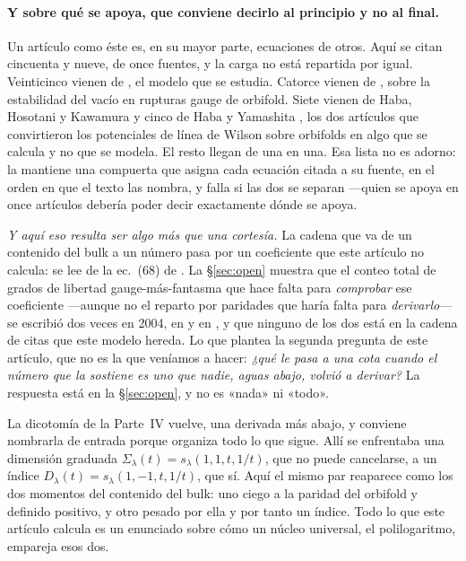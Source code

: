 \documentclass[11pt,a4paper]{article}
\begin{document}
\paragraph{Y sobre qué se apoya, que conviene decirlo al principio y no al final.} Un artículo como
éste es, en su mayor parte, ecuaciones de otros. Aquí se citan cincuenta y nueve, de once fuentes,
y la carga no está repartida por igual. Veinticinco vienen de \cite{KM25}, el modelo que se
estudia. Catorce vienen de \cite{CCD24}, sobre la estabilidad del vacío en rupturas gauge de
orbifold. Siete vienen de Haba, Hosotani y Kawamura \cite{HHK03} y cinco de Haba y Yamashita
\cite{HY04}, los dos artículos que convirtieron los potenciales de línea de Wilson sobre orbifolds
en algo que se calcula y no que se modela. El resto llegan de una en una. Esa lista no es adorno:
la mantiene una compuerta que asigna cada ecuación
citada a su fuente, en el orden en que el texto las nombra, y falla si las dos se separan ---quien
se apoya en once artículos debería poder decir exactamente dónde se apoya.

\emph{Y aquí eso resulta ser algo más que una cortesía.} La cadena que va de un contenido del bulk
a un número pasa por un coeficiente que este artículo no calcula: se lee de la ec.~(68) de
\cite{KM25}. La \S\ref{sec:open} muestra que el conteo total de grados de libertad gauge-más-fantasma
que hace falta para \emph{comprobar} ese coeficiente ---aunque no el reparto por paridades que
haría falta para \emph{derivarlo}--- se
escribió dos veces en 2004, en \cite{HY04} y en \cite{HNT}, y que ninguno de los dos está en la
cadena de citas que este modelo hereda. Lo que plantea la segunda pregunta de este artículo, que no
es la que veníamos a hacer: \emph{¿qué le pasa a una cota cuando el número que la sostiene es uno
que nadie, aguas abajo, volvió a derivar?} La respuesta está en la \S\ref{sec:open}, y no es «nada»
ni «todo».

La dicotomía de la Parte~IV vuelve, una derivada más abajo, y conviene nombrarla de entrada porque
organiza todo lo que sigue. Allí se enfrentaba una dimensión graduada
$\Sigma_\lambda(t)=s_\lambda(1,1,t,1/t)$, que no puede cancelarse, a un índice
$D_\lambda(t)=s_\lambda(1,-1,t,1/t)$, que sí. Aquí el mismo par reaparece como los dos momentos del
contenido del bulk: uno ciego a la paridad del orbifold y definido positivo, y otro pesado por ella
y por tanto un índice. Todo lo que este artículo calcula es un enunciado sobre cómo un núcleo
universal, el polilogaritmo, empareja esos dos.
\end{document}
